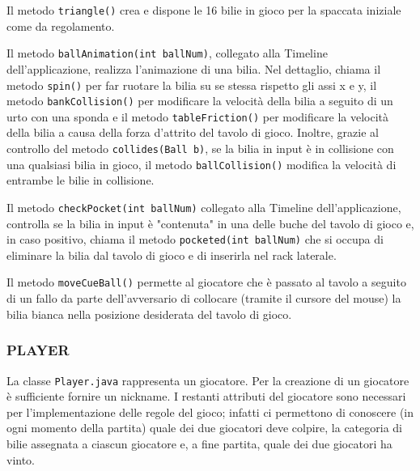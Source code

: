 \documentclass[12pt,a4paper]{report}
\begin{document}
Il metodo \texttt{triangle()} crea e dispone le 16 bilie in gioco per la spaccata iniziale come da regolamento.

\vspace{3mm}

Il metodo \texttt{ballAnimation(int ballNum)}, collegato alla Timeline dell'applicazione, realizza l'animazione di una bilia.
Nel dettaglio, chiama il metodo \texttt{spin()} per far ruotare la bilia su se stessa rispetto gli assi x e y, il metodo \texttt{bankCollision()} per modificare la velocità della bilia a seguito di un urto con una sponda e il metodo \texttt{tableFriction()} per modificare la velocità della bilia a causa della forza d'attrito del tavolo di gioco.
Inoltre, grazie al controllo del metodo \texttt{collides(Ball b)}, se la bilia in input è in collisione con una qualsiasi bilia in gioco, il metodo \texttt{ballCollision()} modifica la velocità di entrambe le bilie in collisione.

\vspace{3mm}

Il metodo \texttt{checkPocket(int ballNum)} collegato alla Timeline dell'applicazione, controlla se la bilia in input è "contenuta" in una delle buche del tavolo di gioco e, in caso positivo, chiama il metodo \texttt{pocketed(int ballNum)} che si occupa di eliminare la bilia dal tavolo di gioco e di inserirla nel rack laterale.

\vspace{3mm}

Il metodo \texttt{moveCueBall()} permette al giocatore che è passato al tavolo a seguito di un fallo da parte dell'avversario di collocare (tramite il cursore del mouse) la bilia bianca nella posizione desiderata del tavolo di gioco.

\subsubsection*{PLAYER}
La classe \texttt{Player.java} rappresenta un giocatore.
Per la creazione di un giocatore è sufficiente fornire un nickname.
I restanti attributi del giocatore sono necessari per l'implementazione delle regole del gioco; infatti ci permettono di conoscere (in ogni momento della partita) quale dei due giocatori deve colpire, la categoria di bilie assegnata a ciascun giocatore e, a fine partita, quale dei due giocatori ha vinto.
\end{document}
